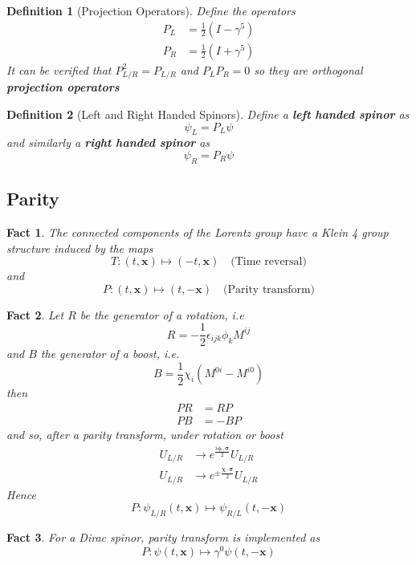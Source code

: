 \documentclass{article}
\newtheorem{definition}{Definition}[subsection]
\newtheorem{fact}{Fact}[subsection]
\newcommand{\eps}{\epsilon}
\newcommand{\bam}[1]{\textbf{#1}}
\begin{document}
\begin{definition}[Projection Operators]
Define the operators 
\begin{align*}
    P_L &= \frac{1}{2}(I-\gamma^5) \\
    P_R &= \frac{1}{2}(I+\gamma^5) 
\end{align*}
It can be verified that $P_{L/R}^2=P_{L/R}$ and $P_L P_R =0$ so they are orthogonal \bam{projection operators}
\end{definition}

\begin{definition}[Left and Right Handed Spinors]
Define a \bam{left handed spinor} as 
\[
\psi_L=P_L \psi
\]
and similarly a \bam{right handed spinor} as 
\[
\psi_R=P_R \psi
\]
\end{definition}

\subsection{Parity}

\begin{fact}
The connected components of the Lorentz group have a Klein 4 group structure induced by the maps 
\[
T: (t,\bm{x}) \mapsto (-t,\bm{x}) \quad \text{(Time reversal)}
\]
and
\[
P: (t,\bm{x}) \mapsto (t, -\bm{x}) \quad \text{(Parity transform)}
\]
\end{fact}
\begin{fact}
Let $R$ be the generator of a rotation, i.e 
\[
R=-\frac{1}{2}\eps_{ijk}\phi_k M^{ij}
\]
and $B$ the generator of a boost, i.e. 
\[
B=\frac{1}{2}\chi_i (M^{0i}-M^{i0})
\]
then
\begin{align*}
    PR &= RP \\
    PB &= -BP 
\end{align*}
and so, after a parity transform, under rotation or boost
\begin{align*}
    U_{L/R} &\to e^{\frac{i\bm{\phi}\cdot\bm{\sigma}}{2}} U_{L/R} \\ 
    U_{L/R} &\to e^{\pm\frac{\bm{\chi}\cdot\bm{\sigma}}{2}} U_{L/R}
\end{align*}
Hence 
\[
P:\psi_{L/R}(t,\bm{x}) \mapsto \psi_{R/L}(t,-\bm{x})
\]
\end{fact}

\begin{fact}
For a Dirac spinor, parity transform is implemented as 
\[
P: \psi(t,\bm{x}) \mapsto \gamma^0 \psi(t,-\bm{x})
\]
\end{fact}
\end{document}
